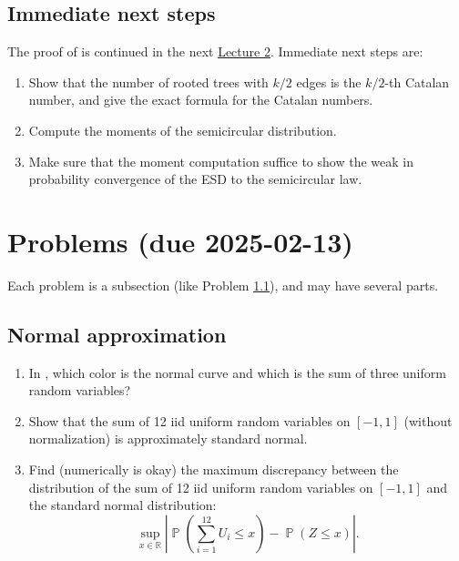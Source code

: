 \documentclass[letterpaper,11pt,oneside,reqno]{article}
\numberwithin{equation}{section}
\theoremstyle{definition}
\begin{document}
\subsection{Immediate next steps}

The proof of  is continued in the next
\href{https://lpetrov.cc/rmt25/rmt25-notes/rmt2025-l02.pdf}{Lecture 2}.
Immediate next steps are:
\begin{enumerate}
	\item Show that the number of rooted trees with $k/2$ edges is the $k/2$-th Catalan number, and give the exact formula for the Catalan numbers.
	\item Compute the moments of the semicircular distribution.
	\item Make sure that the moment computation suffice to show the
		weak in probability convergence of the ESD to the semicircular law.
\end{enumerate}


\appendix
\setcounter{section}{0}

\section{Problems (due 2025-02-13)}

Each problem is a subsection (like Problem \ref{prob:normal-approximation}),
and may have several parts.

\subsection{Normal approximation}
\label{prob:normal-approximation}

\begin{enumerate}
	\item In , which color is
		the normal curve and which is the sum of three uniform random variables?
	\item Show that the sum of 12 iid uniform random variables on $[-1,1]$
		(without normalization) is approximately standard normal.
	\item Find (numerically is okay)
		the maximum discrepancy between the distribution of the sum of 12 iid uniform random variables on $[-1,1]$ and the standard normal distribution:
		\begin{equation*}
			\sup_{x \in \mathbb{R}} \left| \operatorname{\mathbb{P}}\left(  \sum_{i=1}^{12} U_i \leq x \right) - \operatorname{\mathbb{P}}\left( Z \leq x \right) \right|.
		\end{equation*}
\end{enumerate}
\end{document}
